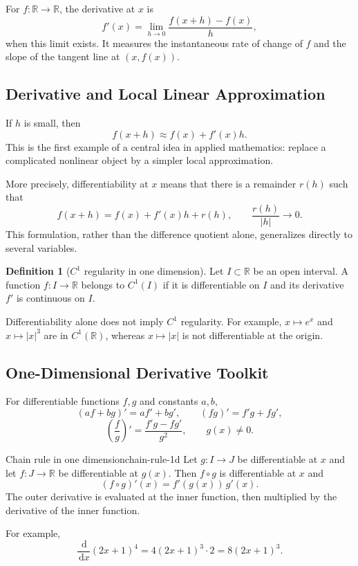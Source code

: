 \documentclass[11pt]{article}
\newcommand{\R}{\mathbb{R}}
\newcommand{\dd}{\,\mathrm{d}}
\theoremstyle{definition}
\newtheorem{definition}{Definition}[section]
\theoremstyle{plain}
\theoremstyle{remark}
\begin{document}
For $f:\R\to\R$, the derivative at $x$ is
\[
f'(x)=\lim_{h\to0}\frac{f(x+h)-f(x)}{h},
\]
when this limit exists. It measures the instantaneous rate of change of $f$ and
the slope of the tangent line at $(x,f(x))$.

\subsection{Derivative and Local Linear Approximation}

If $h$ is small, then
\[
f(x+h)\approx f(x)+f'(x)h.
\]
This is the first example of a central idea in applied mathematics: replace a
complicated nonlinear object by a simpler local approximation.

More precisely, differentiability at $x$ means that there is a remainder
$r(h)$ such that
\[
f(x+h)=f(x)+f'(x)h+r(h),
\qquad
\frac{r(h)}{|h|}\longrightarrow0.
\]
This formulation, rather than the difference quotient alone, generalizes
directly to several variables.

\begin{definition}[$C^1$ regularity in one dimension]
Let $I\subset\R$ be an open interval. A function $f:I\to\R$ belongs to
$C^1(I)$ if it is differentiable on $I$ and its derivative $f'$ is continuous
on $I$.
\end{definition}

Differentiability alone does not imply $C^1$ regularity. For example,
$x\mapsto e^x$ and $x\mapsto|x|^3$ are in $C^1(\R)$, whereas
$x\mapsto|x|$ is not differentiable at the origin.

\subsection{One-Dimensional Derivative Toolkit}

For differentiable functions $f,g$ and constants $a,b$,
\[
(af+bg)'=af'+bg',
\qquad
(fg)'=f'g+fg',
\]
\[
\left(\frac{f}{g}\right)'=\frac{f'g-fg'}{g^2},
\qquad g(x)\neq0.
\]
\begin{keyproposition}{Chain rule in one dimension}{chain-rule-1d}
Let $g:I\to J$ be differentiable at $x$ and let $f:J\to\R$ be
differentiable at $g(x)$. Then $f\circ g$ is differentiable at $x$ and
\[
\boxed{(f\circ g)'(x)=f'(g(x))\,g'(x).}
\]
The outer derivative is evaluated at the inner function, then multiplied by
the derivative of the inner function.
\end{keyproposition}

For example,
\[
\frac{\dd}{\dd x}(2x+1)^4=4(2x+1)^3\cdot2=8(2x+1)^3.
\]
\end{document}
